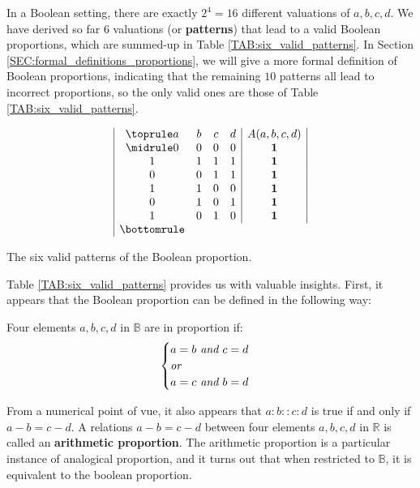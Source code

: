 In a Boolean setting, there are exactly $2^4 = 16$ different valuations of $a,
b, c, d$. We have derived so far $6$ valuations (or \textbf{patterns}) that
lead to a valid Boolean proportions, which are summed-up in Table
\ref{TAB:six_valid_patterns}. In Section
\ref{SEC:formal_definitions_proportions}, we will give a more formal definition
of Boolean proportions, indicating that the remaining $10$ patterns all lead to
incorrect proportions, so the only valid ones are those of Table
\ref{TAB:six_valid_patterns}.

\begin{table}[t]
  \centering
  $$
  \begin{array}{|cccc|c|}
    \toprule
    a & b & c & d &  A(a, b, c, d)\\
    \midrule
    0 & 0 & 0 & 0 &   \textbf{1}\\
    1 & 1 & 1 & 1 &   \textbf{1}\\
    0 & 0 & 1 & 1 &   \textbf{1}\\
    1 & 1 & 0 & 0 &   \textbf{1}\\
    0 & 1 & 0 & 1 &   \textbf{1}\\
    1 & 0 & 1 & 0 &   \textbf{1}\\
    \bottomrule
  \end{array}
  $$
  \caption{The six valid patterns of the Boolean proportion.}
  \label{TAB:six_valid_patterns}
\end{table}

Table \ref{TAB:six_valid_patterns} provides us with valuable insights.  First,
it appears that the Boolean proportion can be defined in the following way:

\begin{definition}
  \label{DEF:boolean_proportion_informal}
  Four elements $a, b, c, d$ in $\mathbb{B}$ are in proportion if:
  $$
  \begin{cases}
    a = b \emph{ and } c = d\\
    \emph{or}\\
    a = c \emph{ and } b = d\\
  \end{cases}
  $$
\end{definition}

From a numerical point of vue, it also appears that $a:b::c:d$ is true if and
only if $a - b = c - d$. A relations $a - b = c - d$ between four elements $a,
b, c, d$ in $\mathbb{R}$ is called an \textbf{arithmetic proportion}.
The arithmetic proportion is a particular instance of analogical proportion, and
it turns out that when restricted to $\mathbb{B}$, it is equivalent to the
boolean proportion.

